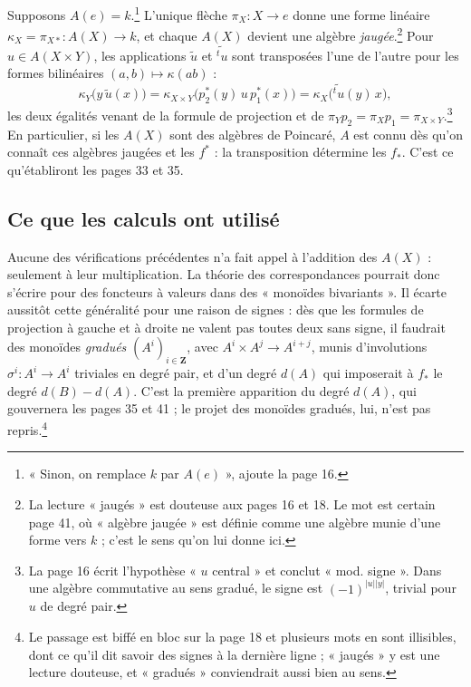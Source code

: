 \documentclass[11pt,a4paper]{article}
\begin{document}
Supposons $A(e) = k$.\footnote{« Sinon, on remplace $k$ par $A(e)$ », ajoute
la page 16.} L'unique flèche $\pi_{X} \colon X \to e$ donne une forme linéaire
$\kappa_{X} = \pi_{X*} \colon A(X) \to k$, et chaque $A(X)$ devient une algèbre
\emph{jaugée}.\footnote{La lecture « jaugés » est douteuse aux pages 16 et 18.
Le mot est certain page 41, où « algèbre jaugée » est définie comme une algèbre
munie d'une forme vers $k$ ; c'est le sens qu'on lui donne ici.} Pour
$u \in A(X \times Y)$, les applications $\tilde{u}$ et
$\widetilde{{}^{t}u}$ sont transposées l'une de l'autre pour les formes
bilinéaires $(a, b) \mapsto \kappa(ab)$ :
\[ \kappa_{Y}\bigl(y\, \tilde{u}(x)\bigr) = \kappa_{X \times Y}\bigl(p_{2}^{*}(y)\, u\, p_{1}^{*}(x)\bigr) = \kappa_{X}\bigl(\widetilde{{}^{t}u}(y)\, x\bigr) , \]
les deux égalités venant de la formule de projection et de
$\pi_{Y} p_{2} = \pi_{X} p_{1} = \pi_{X \times Y}$.\footnote{La page 16 écrit
l'hypothèse « $u$ central » et conclut « mod. signe ». Dans une algèbre
commutative au sens gradué, le signe est $(-1)^{|u||y|}$, trivial pour $u$ de
degré pair.} En particulier, si les $A(X)$ sont des algèbres de Poincaré, $A$
est connu dès qu'on connaît ces algèbres jaugées et les $f^{*}$ : la
transposition détermine les $f_{*}$. C'est ce qu'établiront les pages 33 et 35.

\subsection*{Ce que les calculs ont utilisé}

Aucune des vérifications précédentes n'a fait appel à l'addition des $A(X)$ :
seulement à leur multiplication. La théorie des correspondances pourrait donc
s'écrire pour des foncteurs à valeurs dans des « monoïdes bivariants ». Il
écarte aussitôt cette généralité pour une raison de signes : dès que les
formules de projection à gauche et à droite ne valent pas toutes deux sans
signe, il faudrait des monoïdes \emph{gradués} $(A^{i})_{i \in \mathbf{Z}}$,
avec $A^{i} \times A^{j} \to A^{i+j}$, munis d'involutions
$\sigma^{i} \colon A^{i} \to A^{i}$ triviales en degré pair, et d'un degré
$d(A)$ qui imposerait à $f_{*}$ le degré $d(B) - d(A)$. C'est la première
apparition du degré $d(A)$, qui gouvernera les pages 35 et 41 ; le projet des
monoïdes gradués, lui, n'est pas repris.\footnote{Le passage est biffé en bloc
sur la page 18 et plusieurs mots en sont illisibles, dont ce qu'il dit savoir
des signes à la dernière ligne ; « jaugés » y est une lecture douteuse, et
« gradués » conviendrait aussi bien au sens.}
\end{document}
